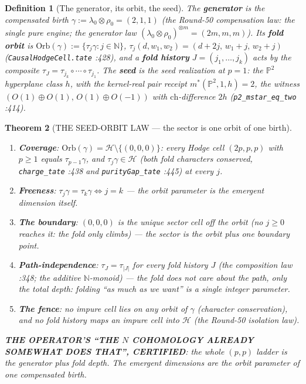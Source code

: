 \documentclass[11pt]{article}
\newtheorem{theorem}{Theorem}[section]
\newtheorem{definition}[theorem]{Definition}
\begin{document}
\begin{definition}[The generator, its orbit, the seed]
\label{def:orbit}
The \textbf{generator} is the compensated birth
$\gamma:=\lambda_0\otimes\rho_0=(2,1,1)$
(the Round-50 compensation law: the single pure engine; the generator law $(\lambda_0\otimes\rho_0)^{\otimes m}=(2m,m,m)$). Its \textbf{fold orbit} is
$\mathrm{Orb}(\gamma):=\{\tau_j\gamma : j\in\mathbb N\}$, $\tau_j(d,w_1,w_2)=(d+2j,\,w_1+j,\,w_2+j)$ (\texttt{CausalHodgeCell.tate} :428), and a \textbf{fold history} $J=(j_1,\dots,j_k)$ acts by the composite $\tau_J=\tau_{j_k}\circ\cdots\circ\tau_{j_1}$. The \textbf{seed} is the seed realization at $p=1$: the $\mathbb P^2$ hyperplane class $h$, with the kernel-real pair receipt $m^*(\mathbb P^2,1,h)=2$, the witness $(O(1)\oplus O(1),\,O(1)\oplus O(-1))$ with $\mathrm{ch}$-difference $2h$ (\texttt{p2\_mstar\_eq\_two} :414).
\end{definition}

\begin{theorem}[THE SEED-ORBIT LAW --- the sector is one orbit of one birth]
\label{thm:orbit}
\begin{enumerate}
\item[(i)] \textbf{Coverage}: $\mathrm{Orb}(\gamma)=\mathcal H\setminus\{(0,0,0)\}$: every Hodge cell $(2p,p,p)$ with $p\ge 1$ equals $\tau_{p-1}\gamma$, and $\tau_j\gamma\in\mathcal H$ (both fold characters conserved, \texttt{charge\_tate} :438 and \texttt{purityGap\_tate} :445) at every $j$.
\item[(ii)] \textbf{Freeness}: $\tau_j\gamma=\tau_k\gamma\iff j=k$ --- the orbit parameter is the emergent dimension itself.
\item[(iii)] \textbf{The boundary}: $(0,0,0)$ is the unique sector cell off the orbit (no $j\ge 0$ reaches it: the fold only climbs) --- the sector is the orbit plus one boundary point.
\item[(iv)] \textbf{Path-independence}: $\tau_J=\tau_{|J|}$ for every fold history $J$ (the composition law :348; the additive $\mathbb N$-monoid) --- \emph{the fold does not care about the path, only the total depth}: folding ``as much as we want'' is a single integer parameter.
\item[(v)] \textbf{The fence}: no impure cell lies on any orbit of $\gamma$ (character conservation), and no fold history maps an impure cell into $\mathcal H$ (the Round-50 isolation law).
\end{enumerate}
\textbf{THE OPERATOR'S ``THE $N$ COHOMOLOGY ALREADY SOMEWHAT DOES THAT'', CERTIFIED}: the whole $(p,p)$ ladder is the generator plus fold depth. The emergent dimensions are the orbit parameter of one compensated birth.
\end{theorem}
\end{document}
